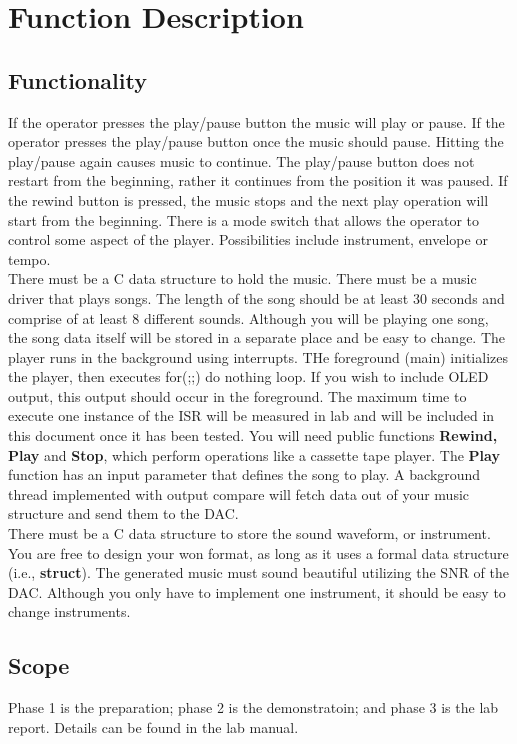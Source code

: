 \documentclass{article}
\begin{document}
\section{Function Description}

	\subsection{Functionality}
		If the operator presses the play/pause button the music will play or pause. If the operator presses the play/pause button once the music should pause. Hitting the play/pause again causes music to continue. The play/pause button does not restart from the beginning, rather it continues from the position it was paused. If the rewind button is pressed, the music stops and the next play operation will start from the beginning. There is a mode switch that allows the operator to control some aspect of the player. Possibilities include instrument, envelope or tempo.\\
		There must be a C data structure to hold the music. There must be a music driver that plays songs. The length of the song should be at least 30 seconds and comprise of at least 8 different sounds. Although you will be playing one song, the song data itself will be stored in a separate place and be easy to change. The player runs in the background using interrupts. THe foreground (main) initializes the player, then executes for(;;){} do nothing loop. If you wish to include OLED output, this output should occur in the foreground. The maximum time to execute one instance of the ISR will be measured in lab and will be included in this document once it has been tested. You will need public functions \textbf{Rewind, Play} and \textbf{Stop}, which perform operations like a cassette tape player. The \textbf{Play} function has an input parameter that defines the song to play. A background thread implemented with output compare will fetch data out of your music structure and send them to the DAC.\\
		There must be a C data structure to store the sound waveform, or instrument. You are free to design your won format, as long as it uses a formal data structure (i.e., \textbf{struct}). The generated music must sound beautiful utilizing the SNR of the DAC. Although you only have to implement one instrument, it should be easy to change instruments.
	\subsection{Scope}
		Phase 1 is the preparation; phase 2 is the demonstratoin; and phase 3 is the lab report. Details can be found in the lab manual.
\end{document}
